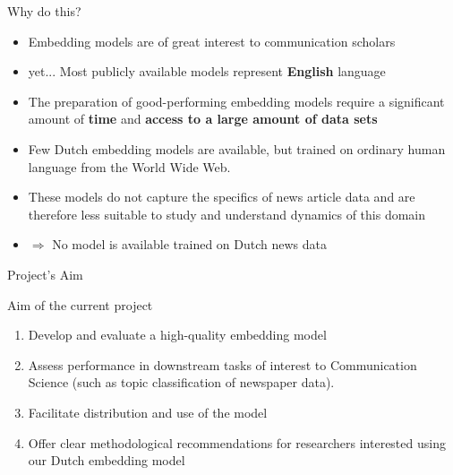 \documentclass[compress]{beamer}
\begin{document}


\begin{frame}{Why do this?}
	\begin{itemize}
		\item Embedding models are of great interest to communication scholars
		\item yet... Most publicly available models represent \textbf{English} language
		\item The preparation of good-performing embedding models require a significant amount of \textbf{time} and \textbf{access to a large amount of data sets}
		\item Few Dutch embedding models are available, but trained on ordinary human language from the World Wide Web.
		\item These models do not capture the specifics of news article data and are therefore less suitable to study and understand dynamics of this domain
		\item $\Rightarrow$ No model is available trained on Dutch news data
	\end{itemize}
\end{frame}


\begin{frame}{Project's Aim}
	\begin{block}{Aim of the current project} 
		\begin{enumerate}
			\item Develop and evaluate a high-quality embedding model
			\item Assess performance in downstream tasks of interest to Communication Science (such as topic classification of newspaper data).
			\item Facilitate distribution and use of the model
			\item Offer clear methodological recommendations for researchers interested using our Dutch embedding model
		\end{enumerate}
	\end{block}
\end{frame}
\end{document}
